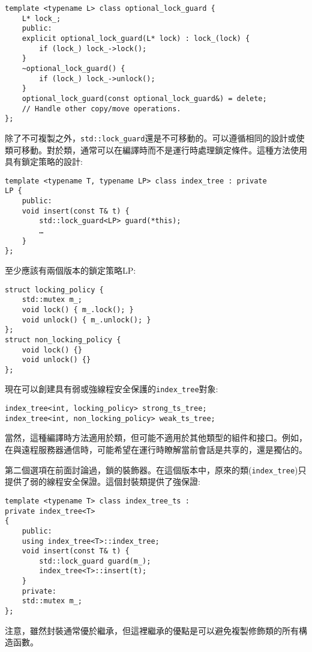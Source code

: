 \begin{lstlisting}[style=styleCXX]
template <typename L> class optional_lock_guard {
	L* lock_;
	public:
	explicit optional_lock_guard(L* lock) : lock_(lock) {
		if (lock_) lock_->lock();
	}
	~optional_lock_guard() {
		if (lock_) lock_->unlock();
	}
	optional_lock_guard(const optional_lock_guard&) = delete;
	// Handle other copy/move operations.
};
\end{lstlisting}

除了不可複製之外，\texttt{std::lock\_guard}還是不可移動的。可以遵循相同的設計或使類可移動。對於類，通常可以在編譯時而不是運行時處理鎖定條件。這種方法使用具有鎖定策略的設計:

\begin{lstlisting}[style=styleCXX]
template <typename T, typename LP> class index_tree : private 
LP {
	public:
	void insert(const T& t) {
		std::lock_guard<LP> guard(*this);
		…
	}
};
\end{lstlisting}

至少應該有兩個版本的鎖定策略LP:

\begin{lstlisting}[style=styleCXX]
struct locking_policy {
	std::mutex m_;
	void lock() { m_.lock(); }
	void unlock() { m_.unlock(); }
};
struct non_locking_policy {
	void lock() {}
	void unlock() {}
};
\end{lstlisting}

現在可以創建具有弱或強線程安全保護的\texttt{index\_tree}對象:

\begin{lstlisting}[style=styleCXX]
index_tree<int, locking_policy> strong_ts_tree;
index_tree<int, non_locking_policy> weak_ts_tree;
\end{lstlisting}

當然，這種編譯時方法適用於類，但可能不適用於其他類型的組件和接口。例如，在與遠程服務器通信時，可能希望在運行時瞭解當前會話是共享的，還是獨佔的。

第二個選項在前面討論過，鎖的裝飾器。在這個版本中，原來的類(\texttt{index\_tree})只提供了弱的線程安全保證。這個封裝類提供了強保證:

\begin{lstlisting}[style=styleCXX]
template <typename T> class index_tree_ts :
private index_tree<T> 
{
	public:
	using index_tree<T>::index_tree;
	void insert(const T& t) {
		std::lock_guard guard(m_);
		index_tree<T>::insert(t);
	}
	private:
	std::mutex m_;
};
\end{lstlisting}

注意，雖然封裝通常優於繼承，但這裡繼承的優點是可以避免複製修飾類的所有構造函數。 

